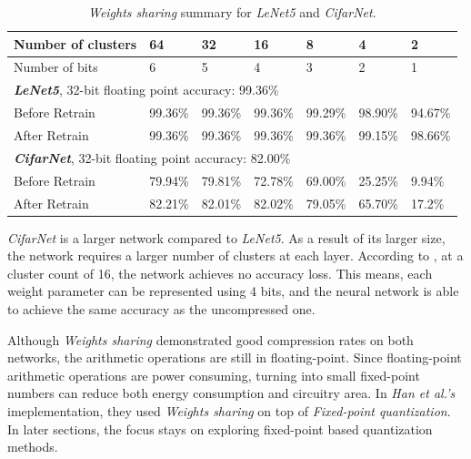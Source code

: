\documentclass[a4paper,12pt]{report}
\begin{document}
\begin{table}[!h]
  \centering
  \begin{tabular}{lllllll}
    \hline
    \hline
    Number of clusters      &64         &32       &16       &8        &4        &2  \\
    \hline
    Number of bits          &6         &5       &4       &3        &2        &1  \\
    \hline
    \hline
    \multicolumn{5}{l}{\textbf{\textit{LeNet5}}, 32-bit floating point accuracy: 99.36\%}\\
    \hline
    Before Retrain          &99.36\%    &99.36\%  &99.36\%  &99.29\%  &98.90\%  &94.67\%\\
    After Retrain           &99.36\%    &99.36\%  &99.36\%  &99.36\%  &99.15\%  &98.66\%\\
    \hline
    \hline
    \multicolumn{5}{l}{\textbf{\textit{CifarNet}}, 32-bit floating point accuracy: 82.00\%}\\
    \hline
    Before Retrain          &79.94\%    &79.81\%  &72.78\%  &69.00\%  &25.25\%  &9.94\%\\
    After Retrain           &82.21\%    &82.01\%  &82.02\%  &79.05\%  &65.70\%  &17.2\%\\
    \hline
    \hline
  \end{tabular}
  \caption{\textit{Weights sharing} summary for \textit{LeNet5} and \textit{CifarNet}.}
  \label{tab:ws_sum}
\end{table}

\textit{CifarNet} is a larger network compared to \textit{LeNet5}.
As a result of its larger size, the network requires a larger number of clusters
at each layer.
According to , at a cluster count of 16,
the network achieves no accuracy loss.
This means, each weight parameter can be represented using 4 bits, and
the neural network is able to achieve the same accuracy as the uncompressed
one.

Although \textit{Weights sharing} demonstrated good compression rates on both networks,
the arithmetic operations are still in floating-point.
Since floating-point arithmetic operations are power consuming, turning
into small fixed-point numbers can reduce both energy consumption and circuitry
area.
In \textit{Han et al.'s} imeplementation, they used \textit{Weights sharing}
on top of \textit{Fixed-point quantization}.
In later sections, the focus stays on exploring fixed-point based quantization
methods.
\end{document}
